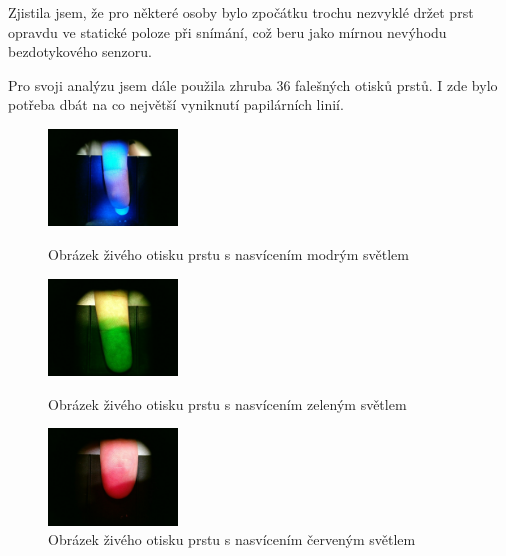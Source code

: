 Zjistila jsem, že pro některé osoby bylo zpočátku trochu nezvyklé držet prst opravdu ve statické poloze při snímání, což beru jako mírnou nevýhodu bezdotykového senzoru. 

Pro svoji analýzu jsem dále použila zhruba 36 falešných otisků prstů. I zde bylo potřeba dbát na co největší vyniknutí papilárních linií.

\begin{figure}[!htbp]
  \begin{minipage}[b]{0.3\linewidth}
    \centering
    \includegraphics[width=130px]{obrazky-figures/live120.jpg}
    \caption{Obrázek živého otisku prstu s nasvícením modrým světlem}
  \end{minipage}
  \hspace{0.3cm}
  \begin{minipage}[b]{0.3\linewidth}
    \centering
    \includegraphics[width=130px]{obrazky-figures/live38.jpg}
    \caption{Obrázek živého otisku prstu s nasvícením zeleným světlem}
  \end{minipage}
  \hspace{0.3cm}
    \begin{minipage}[b]{0.3\linewidth}
    \centering
    \includegraphics[width=130px]{obrazky-figures/live56.jpg}
    \caption{Obrázek živého otisku prstu s nasvícením červeným světlem}
  \end{minipage}
\end{figure}

